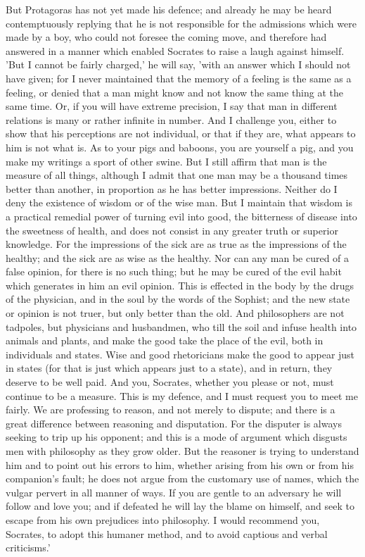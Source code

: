 \documentclass[11pt,letter]{article}
\begin{document}
\par  But Protagoras has not yet made his defence; and already he may be heard contemptuously replying that he is not responsible for the admissions which were made by a boy, who could not foresee the coming move, and therefore had answered in a manner which enabled Socrates to raise a laugh against himself. 'But I cannot be fairly charged,' he will say, 'with an answer which I should not have given; for I never maintained that the memory of a feeling is the same as a feeling, or denied that a man might know and not know the same thing at the same time. Or, if you will have extreme precision, I say that man in different relations is many or rather infinite in number. And I challenge you, either to show that his perceptions are not individual, or that if they are, what appears to him is not what is. As to your pigs and baboons, you are yourself a pig, and you make my writings a sport of other swine. But I still affirm that man is the measure of all things, although I admit that one man may be a thousand times better than another, in proportion as he has better impressions. Neither do I deny the existence of wisdom or of the wise man. But I maintain that wisdom is a practical remedial power of turning evil into good, the bitterness of disease into the sweetness of health, and does not consist in any greater truth or superior knowledge. For the impressions of the sick are as true as the impressions of the healthy; and the sick are as wise as the healthy. Nor can any man be cured of a false opinion, for there is no such thing; but he may be cured of the evil habit which generates in him an evil opinion. This is effected in the body by the drugs of the physician, and in the soul by the words of the Sophist; and the new state or opinion is not truer, but only better than the old. And philosophers are not tadpoles, but physicians and husbandmen, who till the soil and infuse health into animals and plants, and make the good take the place of the evil, both in individuals and states. Wise and good rhetoricians make the good to appear just in states (for that is just which appears just to a state), and in return, they deserve to be well paid. And you, Socrates, whether you please or not, must continue to be a measure. This is my defence, and I must request you to meet me fairly. We are professing to reason, and not merely to dispute; and there is a great difference between reasoning and disputation. For the disputer is always seeking to trip up his opponent; and this is a mode of argument which disgusts men with philosophy as they grow older. But the reasoner is trying to understand him and to point out his errors to him, whether arising from his own or from his companion's fault; he does not argue from the customary use of names, which the vulgar pervert in all manner of ways. If you are gentle to an adversary he will follow and love you; and if defeated he will lay the blame on himself, and seek to escape from his own prejudices into philosophy. I would recommend you, Socrates, to adopt this humaner method, and to avoid captious and verbal criticisms.'
\end{document}
